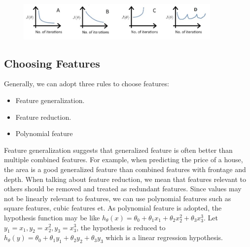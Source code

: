 \documentclass{article}
\begin{document}
\begin{figure}[ht]
  \centering
  \includegraphics[width=10cm]{Figure1.jpg}\\
  \caption{}\label{learning_rate_choice}
\end{figure}

\subsection{Choosing Features}
Generally, we can adopt three rules to choose features:
\begin{itemize}
\item Feature generalization.
\item Feature reduction.
\item Polynomial feature
\end{itemize}
Feature generalization suggests that generalized feature is often better than multiple combined features. For example, when predicting the price of a house, the area is a good generalized feature than combined features with frontage and depth. When talking about feature reduction, we mean that features relevant to others should be removed and treated as redundant features. Since values may not be linearly relevant to features, we can use polynomial features such as square features, cubic features et. As polynomial feature is adopted, the hypothesis function may be like $h_{\theta}(x) = \theta_{0} + \theta_{1}x_{1} + \theta_{2}x_{2}^{2} + \theta_{3}x_{3}^{3}$. Let $y_{1} = x_{1}, y_{2} = x_{2}^{2}, y_{3} = x_{3} ^ {3}$, the hypothesis is reduced to $h_{\theta}(y) = \theta_{0} + \theta_{1}y_{1} + \theta_{2}y_{2} + \theta_{3}y_{3}$ which is a linear regression hypothesis.
\end{document}
